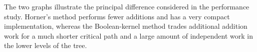 The two graphs illustrate the principal difference considered in the
performance study.  Horner's method performs fewer additions and has a very
compact implementation, whereas the Boolean-kernel method trades additional
addition work for a much shorter critical path and a large amount of
independent work in the lower levels of the tree.
